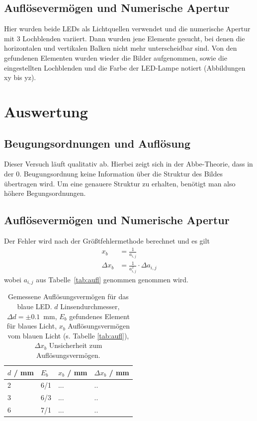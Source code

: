 \documentclass{article}
\begin{document}
\subsection{Auflösevermögen und Numerische Apertur}



Hier wurden beide LEDs als Lichtquellen verwendet und die numerische Apertur mit 3 Lochblenden variiert. Dann wurden jene Elemente gesucht, bei denen die horizontalen und vertikalen Balken nicht mehr unterscheidbar sind. Von den gefundenen Elementen wurden wieder die Bilder aufgenommen, sowie die eingestellten Lochblenden und die Farbe der LED-Lampe notiert (Abbildungen xy bis yz).

\newpage



\section{Auswertung}

\subsection{Beugungsordnungen und Auflösung}

Dieser Versuch läuft qualitativ ab. Hierbei zeigt sich in der Abbe-Theorie, dass in der 0. Beugungsordnung keine Information über die Struktur des Bildes übertragen wird. Um eine genauere Struktur zu erhalten, benötigt man also höhere Begungsordnungen.




\subsection{Auflösevermögen und Numerische Apertur}


Der Fehler wird nach der Größtfehlermethode berechnet und es gilt
\begin{align*}
x_b &= \frac{1}{a_{i,j}} \\
\Delta x_b &= \frac{1}{a_{i,j}^2}\cdot \Delta a_{i,j}
\end{align*}
wobei $a_{i,j}$ aus Tabelle~\ref{tab:aufl} genommen genommen wird. 


\begin{table}[H]
\caption{Gemessene Auflösungsvermögen für das blaue LED. $d$ Linsendurchmesser, $\Delta d = \pm 0.1$~mm, $E_b$ gefundenes Element für blaues Licht, $x_b$ Auflösungsvermögen vom blauen Licht (s. Tabelle \ref{tab:aufl}), $\Delta x_b$ Unsicherheit zum Auflösungsvermögen.}

\begin{tabular}{llll}
$d$ / mm & $E_b$ & $x_b$ / mm & $\Delta x_b$ / mm \\
\hline
2 & 6/1 & ... & .. \\
3 & 6/3 & ... & .. \\
6 & 7/1 & ... & .. 
\end{tabular}
\end{table}
\end{document}
